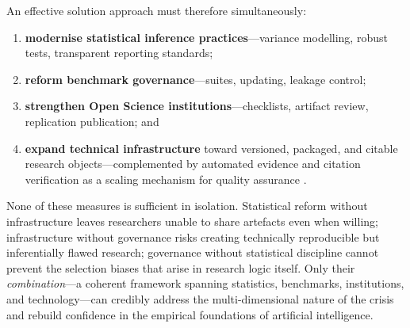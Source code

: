 \documentclass[12pt, a4paper]{article}
\begin{document}
An effective solution approach must therefore simultaneously:
\begin{enumerate}[label=(\alph*), leftmargin=*]
  \item \textbf{modernise statistical inference practices}---variance
        modelling, robust tests, transparent reporting standards;
  \item \textbf{reform benchmark governance}---suites, updating, leakage
        control;
  \item \textbf{strengthen Open Science institutions}---checklists,
        artifact review, replication publication; and
  \item \textbf{expand technical infrastructure} toward versioned,
        packaged, and citable research objects---complemented by
        automated evidence and citation verification as a scaling
        mechanism for quality assurance \cite{Pineau2021}.
\end{enumerate}

None of these measures is sufficient in isolation.  Statistical reform
without infrastructure leaves researchers unable to share artefacts even
when willing; infrastructure without governance risks creating
technically reproducible but inferentially flawed research; governance
without statistical discipline cannot prevent the selection biases that
arise in research logic itself.  Only their \emph{combination}---a
coherent framework spanning statistics, benchmarks, institutions, and
technology---can credibly address the multi-dimensional nature of the
crisis and rebuild confidence in the empirical foundations of artificial
intelligence.

\newpage

\end{document}
